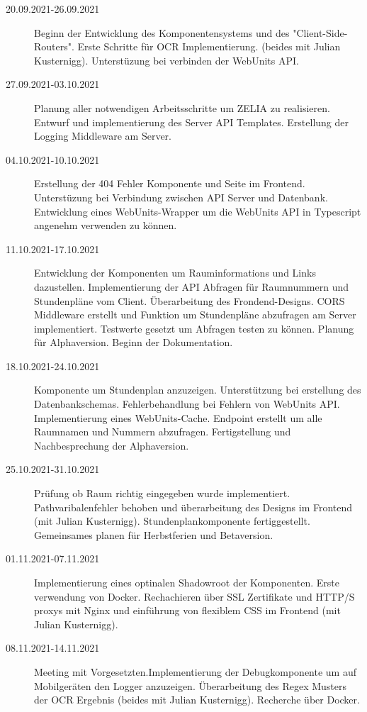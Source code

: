 
\begin{description}
    \item[20.09.2021-26.09.2021] Beginn der Entwicklung des Komponentensystems und des "Client-Side-Routers". Erste Schritte für OCR Implementierung. (beides mit Julian Kusternigg). Unterstüzung bei verbinden der WebUnits API.
    \item[27.09.2021-03.10.2021] Planung aller notwendigen Arbeitsschritte um ZELIA zu realisieren. Entwurf und implementierung des Server API Templates. Erstellung der Logging Middleware am Server.
    \item[04.10.2021-10.10.2021] Erstellung der 404 Fehler Komponente und Seite im Frontend. Unterstüzung bei Verbindung zwischen API Server und Datenbank. Entwicklung eines WebUnits-Wrapper um die WebUnits API in Typescript angenehm verwenden zu können.
    \item[11.10.2021-17.10.2021] Entwicklung der Komponenten um Rauminformations und Links dazustellen. Implementierung der API Abfragen für Raumnummern und Stundenpläne vom Client. Überarbeitung des Frondend-Designs. CORS Middleware erstellt und Funktion um Stundenpläne abzufragen am Server implementiert. Testwerte gesetzt um Abfragen testen zu können. Planung für Alphaversion. Beginn der Dokumentation. 
    \item[18.10.2021-24.10.2021] Komponente um Stundenplan anzuzeigen. Unterstützung bei erstellung des Datenbankschemas. Fehlerbehandlung bei Fehlern von WebUnits API. Implementierung eines WebUnits-Cache. Endpoint erstellt um alle Raumnamen und Nummern abzufragen. Fertigstellung und Nachbesprechung der Alphaversion.
    \item[25.10.2021-31.10.2021] Prüfung ob Raum richtig eingegeben wurde implementiert. Pathvaribalenfehler behoben und überarbeitung des Designs im Frontend (mit Julian Kusternigg). Stundenplankomponente fertiggestellt. Gemeinsames planen für Herbstferien und Betaversion. 
    \item[01.11.2021-07.11.2021] Implementierung eines optinalen Shadowroot der Komponenten. Erste verwendung von Docker. Rechachieren über SSL Zertifikate und HTTP/S proxys mit Nginx und einführung von flexiblem CSS im Frontend (mit Julian Kusternigg).
    \item[08.11.2021-14.11.2021] Meeting mit Vorgesetzten.Implementierung der Debugkomponente um auf Mobilgeräten den Logger anzuzeigen. Überarbeitung des Regex Musters der OCR Ergebnis (beides mit Julian Kusternigg). Recherche über Docker.

\end{description}
